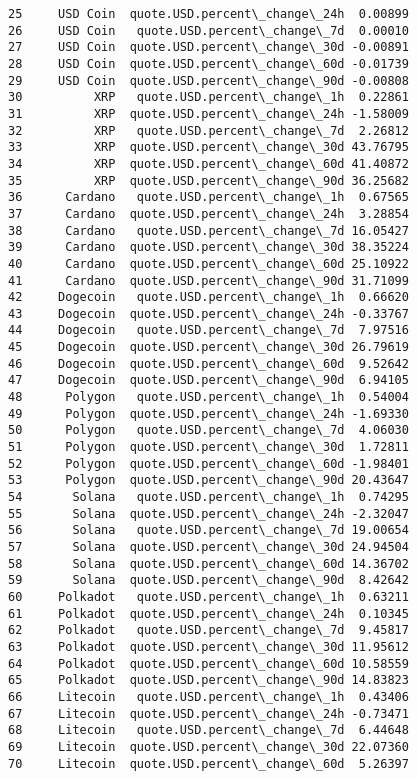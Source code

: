\documentclass[11pt]{article}
\begin{document}
\begin{tcolorbox}[breakable, size=fbox, boxrule=.5pt, pad at break*=1mm, opacityfill=0]
\begin{Verbatim}[commandchars=\\\{\}]
25     USD Coin  quote.USD.percent\_change\_24h  0.00899
26     USD Coin   quote.USD.percent\_change\_7d  0.00010
27     USD Coin  quote.USD.percent\_change\_30d -0.00891
28     USD Coin  quote.USD.percent\_change\_60d -0.01739
29     USD Coin  quote.USD.percent\_change\_90d -0.00808
30          XRP   quote.USD.percent\_change\_1h  0.22861
31          XRP  quote.USD.percent\_change\_24h -1.58009
32          XRP   quote.USD.percent\_change\_7d  2.26812
33          XRP  quote.USD.percent\_change\_30d 43.76795
34          XRP  quote.USD.percent\_change\_60d 41.40872
35          XRP  quote.USD.percent\_change\_90d 36.25682
36      Cardano   quote.USD.percent\_change\_1h  0.67565
37      Cardano  quote.USD.percent\_change\_24h  3.28854
38      Cardano   quote.USD.percent\_change\_7d 16.05427
39      Cardano  quote.USD.percent\_change\_30d 38.35224
40      Cardano  quote.USD.percent\_change\_60d 25.10922
41      Cardano  quote.USD.percent\_change\_90d 31.71099
42     Dogecoin   quote.USD.percent\_change\_1h  0.66620
43     Dogecoin  quote.USD.percent\_change\_24h -0.33767
44     Dogecoin   quote.USD.percent\_change\_7d  7.97516
45     Dogecoin  quote.USD.percent\_change\_30d 26.79619
46     Dogecoin  quote.USD.percent\_change\_60d  9.52642
47     Dogecoin  quote.USD.percent\_change\_90d  6.94105
48      Polygon   quote.USD.percent\_change\_1h  0.54004
49      Polygon  quote.USD.percent\_change\_24h -1.69330
50      Polygon   quote.USD.percent\_change\_7d  4.06030
51      Polygon  quote.USD.percent\_change\_30d  1.72811
52      Polygon  quote.USD.percent\_change\_60d -1.98401
53      Polygon  quote.USD.percent\_change\_90d 20.43647
54       Solana   quote.USD.percent\_change\_1h  0.74295
55       Solana  quote.USD.percent\_change\_24h -2.32047
56       Solana   quote.USD.percent\_change\_7d 19.00654
57       Solana  quote.USD.percent\_change\_30d 24.94504
58       Solana  quote.USD.percent\_change\_60d 14.36702
59       Solana  quote.USD.percent\_change\_90d  8.42642
60     Polkadot   quote.USD.percent\_change\_1h  0.63211
61     Polkadot  quote.USD.percent\_change\_24h  0.10345
62     Polkadot   quote.USD.percent\_change\_7d  9.45817
63     Polkadot  quote.USD.percent\_change\_30d 11.95612
64     Polkadot  quote.USD.percent\_change\_60d 10.58559
65     Polkadot  quote.USD.percent\_change\_90d 14.83823
66     Litecoin   quote.USD.percent\_change\_1h  0.43406
67     Litecoin  quote.USD.percent\_change\_24h -0.73471
68     Litecoin   quote.USD.percent\_change\_7d  6.44648
69     Litecoin  quote.USD.percent\_change\_30d 22.07360
70     Litecoin  quote.USD.percent\_change\_60d  5.26397

\end{Verbatim}
\end{tcolorbox}
\end{document}

